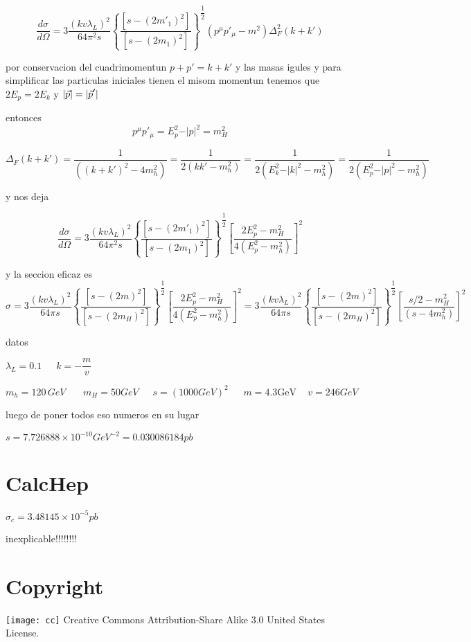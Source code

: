 \[
\dfrac{d\sigma}{d\Omega}=3\dfrac{\left(kv\lambda_{L}\right)^{2}}{64\pi^{2}s}\left\{ \dfrac{\left[s-(2m'_{1})^{2}\right]}{\left[s-(2m_{1})^{2}\right]}\right\} ^{\dfrac{1}{2}}(p^{\mu}p'_{\mu}-m^{2})\Delta_{F}^{2}(k+k')\]


por conservacion del cuadrimomentun $p+p'=k+k'$ y las masas igules
y para simplificar las particulas iniciales tienen el misom momentun
tenemos que $2E_{p}=2E_{k}$ y $\vert\vec{p}\vert=\vert\text{\ensuremath{\vec{p}}}'\vert$

entonces \[
p^{\mu}p'_{\mu}=E_{p}^{2}-\vert p\vert^{2}=m_{H}^{2}\]


\[
\Delta_{F}(k+k')=\dfrac{1}{((k+k')^{2}-4m_{h}^{2})}=\dfrac{1}{2\left(kk'-m_{h}^{2}\right)}=\dfrac{1}{2(E_{k}^{2}-\vert k\vert^{2}-m_{h}^{2})}=\dfrac{1}{2(E_{p}^{2}-\vert p\vert^{2}-m_{h}^{2})}\]


y nos deja 

\[
\dfrac{d\sigma}{d\Omega}=3\dfrac{\left(kv\lambda_{L}\right)^{2}}{64\pi^{2}s}\left\{ \dfrac{\left[s-(2m'_{1})^{2}\right]}{\left[s-(2m_{1})^{2}\right]}\right\} ^{\dfrac{1}{2}}\left[\dfrac{2E_{p}^{2}-m_{H}^{2}}{4(E_{p}^{2}-m_{h}^{2})}\right]^{2}\]


y la seccion eficaz es \[
\sigma=3\dfrac{\left(kv\lambda_{L}\right)^{2}}{64\pi s}\left\{ \dfrac{\left[s-(2m)^{2}\right]}{\left[s-(2m_{H})^{2}\right]}\right\} ^{\dfrac{1}{2}}\left[\dfrac{2E_{p}^{2}-m_{H}^{2}}{4(E_{p}^{2}-m_{h}^{2})}\right]^{2}=3\dfrac{\left(kv\lambda_{L}\right)^{2}}{64\pi s}\left\{ \dfrac{\left[s-(2m)^{2}\right]}{\left[s-(2m_{H})^{2}\right]}\right\} ^{\dfrac{1}{2}}\left[\dfrac{s/2-m_{H}^{2}}{(s-4m_{h}^{2})}\right]^{2}\]


datos 

$\lambda_{L}=0.1\,\,\,\,\,\,\,\,\, k=-\dfrac{m}{v}$

$m_{h}=120\, GeV\,\,\,\,\,\,\,\,\,\,\, m_{H}=50GeV\,\,\,\,\,\,\,\,\, s=(1000GeV)^{2}\,\,\,\,\,\,\,\,\: m=4.3\text{GeV}\,\,\,\,\,\,\, v=246GeV$

luego de poner todos eso numeros en su lugar

$s=7.726888\times10^{-10}GeV^{-2}=0.030086184pb$


\section*{CalcHep }

$\sigma_{c}=3.48145\times10^{-5}pb$

inexplicable!!!!!!!!

\section{Copyright}
\texttt{[image: cc]} Creative Commons Attribution-Share Alike 3.0 United States License.


